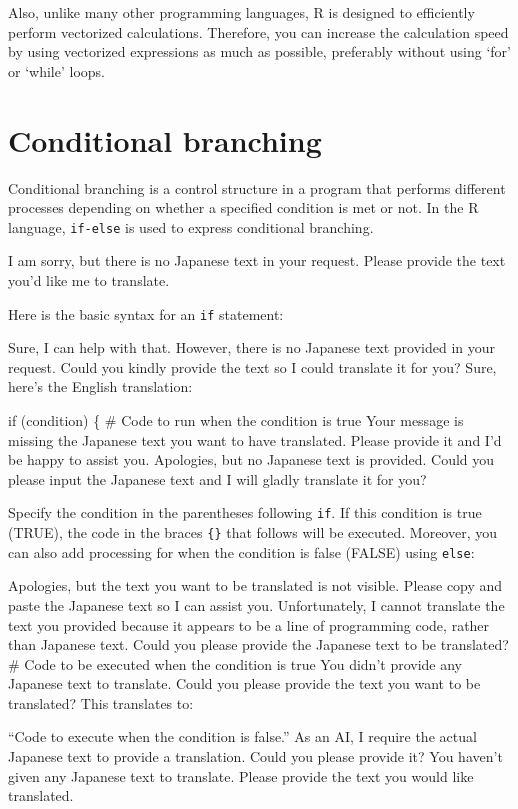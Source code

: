 \documentclass[
  a4paper,
]{book}
\begin{document}
Also, unlike many other programming languages, R is designed to
efficiently perform vectorized calculations. Therefore, you can increase
the calculation speed by using vectorized expressions as much as
possible, preferably without using `for' or `while' loops.

\section{Conditional branching}\label{conditional-branching}

Conditional branching is a control structure in a program that performs
different processes depending on whether a specified condition is met or
not. In the R language, \texttt{if-else} is used to express conditional
branching.

I am sorry, but there is no Japanese text in your request. Please
provide the text you'd like me to translate.

Here is the basic syntax for an \texttt{if} statement:

Sure, I can help with that. However, there is no Japanese text provided
in your request. Could you kindly provide the text so I could translate
it for you? Sure, here's the English translation:

if (condition) \{ \# Code to run when the condition is true Your message
is missing the Japanese text you want to have translated. Please provide
it and I'd be happy to assist you. Apologies, but no Japanese text is
provided. Could you please input the Japanese text and I will gladly
translate it for you?

Specify the condition in the parentheses following \texttt{if}. If this
condition is true (TRUE), the code in the braces \texttt{\{\}} that
follows will be executed. Moreover, you can also add processing for when
the condition is false (FALSE) using \texttt{else}:

Apologies, but the text you want to be translated is not visible. Please
copy and paste the Japanese text so I can assist you. Unfortunately, I
cannot translate the text you provided because it appears to be a line
of programming code, rather than Japanese text. Could you please provide
the Japanese text to be translated? \# Code to be executed when the
condition is true You didn't provide any Japanese text to translate.
Could you please provide the text you want to be translated? This
translates to:

``Code to execute when the condition is false.'' As an AI, I require the
actual Japanese text to provide a translation. Could you please provide
it? You haven't given any Japanese text to translate. Please provide the
text you would like translated.
\end{document}
